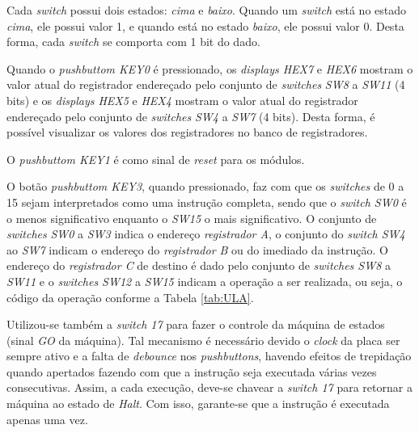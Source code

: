 \documentclass[11pt,a4paper,titlepage]{article}
\begin{document}
Cada \textit{switch} possui dois estados: \textit{cima} e \textit{baixo}. Quando um \textit{switch} está no estado \textit{cima}, ele possui valor 1, e quando está no estado \textit{baixo}, ele possui valor 0. Desta forma, cada \textit{switch} se comporta com 1 bit do dado.

Quando o \textit{pushbuttom KEY0} é pressionado, os \textit{displays HEX7} e \textit{HEX6} mostram o valor atual do registrador endereçado pelo conjunto de \textit{switches} \textit{SW8} a \textit{SW11} (4 bits) e os \textit{displays HEX5} e \textit{HEX4} mostram o valor atual do registrador endereçado pelo conjunto de \textit{switches} \textit{SW4} a \textit{SW7} (4 bits). Desta forma, é possível visualizar os valores dos registradores no banco de registradores.

O \textit{pushbuttom KEY1} é como sinal de \textit{reset} para os módulos.

O botão \textit{pushbuttom KEY3}, quando pressionado, faz com que os \textit{switches} de 0 a 15 sejam interpretados como uma instrução completa, sendo que o \textit{switch SW0} é o menos significativo enquanto o \textit{SW15} o mais significativo. O conjunto de \textit{switches} \textit{SW0} a \textit{SW3} indica o endereço \textit{registrador A}, o conjunto do \textit{switch SW4} ao \textit{SW7} indicam o endereço do \textit{registrador B} ou do imediado da instrução. O endereço do \textit{registrador C} de destino é dado pelo conjunto de \textit{switches SW8} a \textit{SW11} e o \textit{switches SW12} a \textit{SW15} indicam a operação a ser realizada, ou seja, o código da operação conforme a Tabela \ref{tab:ULA}.

Utilizou-se também a \textit{switch 17} para fazer o controle da máquina de estados (sinal \textit{GO} da máquina). Tal mecanismo é necessário devido o \textit{clock} da placa ser sempre ativo e a falta de \textit{debounce} nos \textit{pushbuttons}, havendo efeitos de trepidação quando apertados fazendo com que a instrução seja executada várias vezes consecutivas. Assim, a cada execução, deve-se chavear a \textit{switch 17} para retornar a máquina ao estado de \textit{Halt}. Com isso, garante-se que a instrução é executada apenas uma vez.
\end{document}
